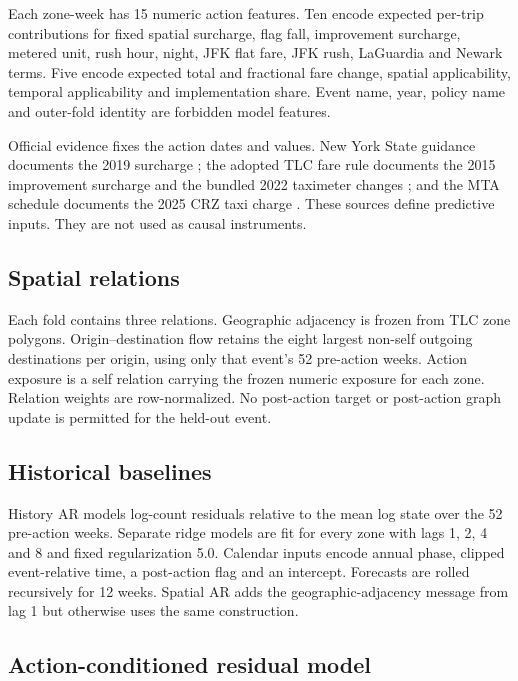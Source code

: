 \documentclass{nature}
\begin{document}
\begin{methods}
Each zone-week has 15 numeric action features. Ten encode expected per-trip contributions for fixed spatial surcharge, flag fall, improvement surcharge, metered unit, rush hour, night, JFK flat fare, JFK rush, LaGuardia and Newark terms. Five encode expected total and fractional fare change, spatial applicability, temporal applicability and implementation share. Event name, year, policy name and outer-fold identity are forbidden model features.

Official evidence fixes the action dates and values. New York State guidance documents the 2019 surcharge \cite{nys2019surcharge}; the adopted TLC fare rule documents the 2015 improvement surcharge and the bundled 2022 taximeter changes \cite{tlc2022fare}; and the MTA schedule documents the 2025 CRZ taxi charge \cite{mta2025crz}. These sources define predictive inputs. They are not used as causal instruments.

\subsection{Spatial relations}

Each fold contains three relations. Geographic adjacency is frozen from TLC zone polygons. Origin--destination flow retains the eight largest non-self outgoing destinations per origin, using only that event's 52 pre-action weeks. Action exposure is a self relation carrying the frozen numeric exposure for each zone. Relation weights are row-normalized. No post-action target or post-action graph update is permitted for the held-out event.

\subsection{Historical baselines}

History AR models log-count residuals relative to the mean log state over the 52 pre-action weeks. Separate ridge models are fit for every zone with lags 1, 2, 4 and 8 and fixed regularization 5.0. Calendar inputs encode annual phase, clipped event-relative time, a post-action flag and an intercept. Forecasts are rolled recursively for 12 weeks. Spatial AR adds the geographic-adjacency message from lag 1 but otherwise uses the same construction.

\subsection{Action-conditioned residual model}


\end{methods}
\end{document}
